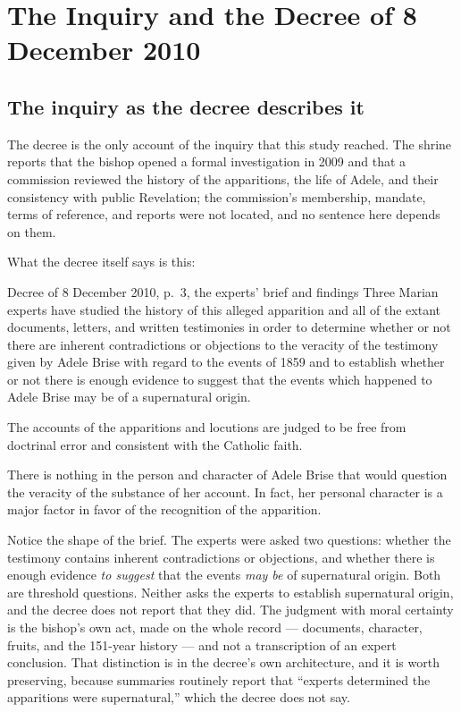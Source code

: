 \section{The Inquiry and the Decree of 8 December 2010}

\subsection{The inquiry as the decree describes it}

The decree is the only account of the inquiry that this study reached.
The shrine reports that the bishop opened a formal investigation in
2009 and that a commission reviewed the history of the apparitions, the
life of Adele, and their consistency with public Revelation; the
commission's membership, mandate, terms of reference, and reports were
not located, and no sentence here depends on them.

What the decree itself says is this:

\begin{witnesstext}{Decree of 8 December 2010, p.~3, the experts'
brief and findings}
Three Marian experts have studied the history of this alleged
apparition and all of the extant documents, letters, and written
testimonies in order to determine whether or not there are inherent
contradictions or objections to the veracity of the testimony given by
Adele Brise with regard to the events of 1859 and to establish whether
or not there is enough evidence to suggest that the events which
happened to Adele Brise may be of a supernatural origin.\par
The accounts of the apparitions and locutions are judged to be free
from doctrinal error and consistent with the Catholic faith.\par
There is nothing in the person and character of Adele Brise that would
question the veracity of the substance of her account. In fact, her
personal character is a major factor in favor of the recognition of the
apparition.
\end{witnesstext}

Notice the shape of the brief. The experts were asked two questions:
whether the testimony contains inherent contradictions or objections,
and whether there is enough evidence \emph{to suggest} that the events
\emph{may be} of supernatural origin. Both are threshold questions.
Neither asks the experts to establish supernatural origin, and the
decree does not report that they did. The judgment with moral certainty
is the bishop's own act, made on the whole record --- documents,
character, fruits, and the 151-year history --- and not a transcription
of an expert conclusion. That distinction is in the decree's own
architecture, and it is worth preserving, because summaries routinely
report that ``experts determined the apparitions were supernatural,''
which the decree does not say.

